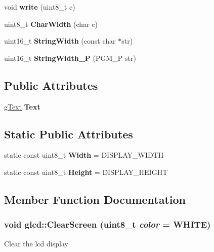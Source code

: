 \begin{DoxyCompactItemize}
\item 
\hypertarget{classglcd_afd6683a3a20254d57a3ddc2069cbb18d}{
void {\bfseries write} (uint8\_\-t c)}
\label{classglcd_afd6683a3a20254d57a3ddc2069cbb18d}

\item 
\hypertarget{classglcd_a7329a9661c9d38f4c221c70f7c867e24}{
uint8\_\-t {\bfseries CharWidth} (char c)}
\label{classglcd_a7329a9661c9d38f4c221c70f7c867e24}

\item 
\hypertarget{classglcd_a4b9e13b6ab8d3fad24f71fc32ff40a82}{
uint16\_\-t {\bfseries StringWidth} (const char $\ast$str)}
\label{classglcd_a4b9e13b6ab8d3fad24f71fc32ff40a82}

\item 
\hypertarget{classglcd_a4066f4d5c02e422056da92d6b90d224b}{
uint16\_\-t {\bfseries StringWidth\_\-P} (PGM\_\-P str)}
\label{classglcd_a4066f4d5c02e422056da92d6b90d224b}

\end{DoxyCompactItemize}
\subsection*{Public Attributes}
\begin{DoxyCompactItemize}
\item 
\hypertarget{classglcd_a74a050a4cd0f4660fbcf3b8d79b3cd73}{
\hyperlink{classg_text}{gText} {\bfseries Text}}
\label{classglcd_a74a050a4cd0f4660fbcf3b8d79b3cd73}

\end{DoxyCompactItemize}
\subsection*{Static Public Attributes}
\begin{DoxyCompactItemize}
\item 
\hypertarget{classglcd_ade27e0efd44c425139650e4d455b1902}{
static const uint8\_\-t {\bfseries Width} = DISPLAY\_\-WIDTH}
\label{classglcd_ade27e0efd44c425139650e4d455b1902}

\item 
\hypertarget{classglcd_a5c39b5959eb3298731f6dfb22aec50d9}{
static const uint8\_\-t {\bfseries Height} = DISPLAY\_\-HEIGHT}
\label{classglcd_a5c39b5959eb3298731f6dfb22aec50d9}

\end{DoxyCompactItemize}


\subsection{Member Function Documentation}
\hypertarget{classglcd_a0bfcbfcca05643356eefbc0f94a62ea6}{
\subsubsection[{ClearScreen}]{\setlength{\rightskip}{0pt plus 5cm}void glcd::ClearScreen (uint8\_\-t {\em color} = {\ttfamily WHITE})}}
\label{classglcd_a0bfcbfcca05643356eefbc0f94a62ea6}
Clear the lcd display



